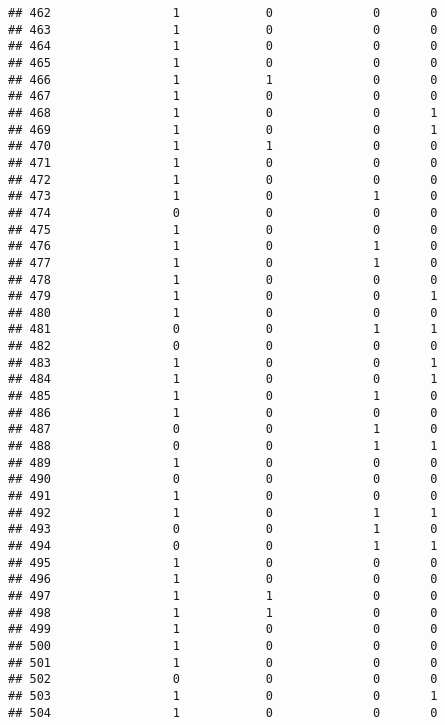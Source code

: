\documentclass[]{article}
\begin{document}
\begin{verbatim}
## 462                 1            0              0       0
## 463                 1            0              0       0
## 464                 1            0              0       0
## 465                 1            0              0       0
## 466                 1            1              0       0
## 467                 1            0              0       0
## 468                 1            0              0       1
## 469                 1            0              0       1
## 470                 1            1              0       0
## 471                 1            0              0       0
## 472                 1            0              0       0
## 473                 1            0              1       0
## 474                 0            0              0       0
## 475                 1            0              0       0
## 476                 1            0              1       0
## 477                 1            0              1       0
## 478                 1            0              0       0
## 479                 1            0              0       1
## 480                 1            0              0       0
## 481                 0            0              1       1
## 482                 0            0              0       0
## 483                 1            0              0       1
## 484                 1            0              0       1
## 485                 1            0              1       0
## 486                 1            0              0       0
## 487                 0            0              1       0
## 488                 0            0              1       1
## 489                 1            0              0       0
## 490                 0            0              0       0
## 491                 1            0              0       0
## 492                 1            0              1       1
## 493                 0            0              1       0
## 494                 0            0              1       1
## 495                 1            0              0       0
## 496                 1            0              0       0
## 497                 1            1              0       0
## 498                 1            1              0       0
## 499                 1            0              0       0
## 500                 1            0              0       0
## 501                 1            0              0       0
## 502                 0            0              0       0
## 503                 1            0              0       1
## 504                 1            0              0       0

\end{verbatim}
\end{document}
